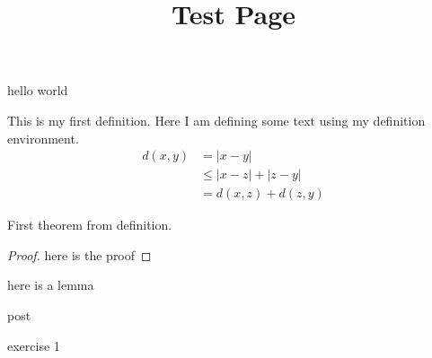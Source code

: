 \documentclass[a4paper]{article}
\date{}
\title{\flushleft \textbf{Test Page}}
\begin{document}
	\maketitle
	hello world
	\begin{definition}
		This is my first definition. Here I am defining some text using my definition environment.
		\begin{align*}
			d(x,y) &= |x-y| \\
			&\leq |x-z| + |z-y| \\
			&= d(x,z) + d(z,y)
		\end{align*}
	\end{definition}
	
	\begin{theorem}
		First theorem from definition.
	\end{theorem}
	\begin{proof}
		here is the proof
	\end{proof}
	
	\begin{lemma}
		here is a lemma
	\end{lemma}
	
	\begin{postulate}
		post
	\end{postulate}
	
	\begin{example}
		exercise 1
	\end{example}
\end{document}
